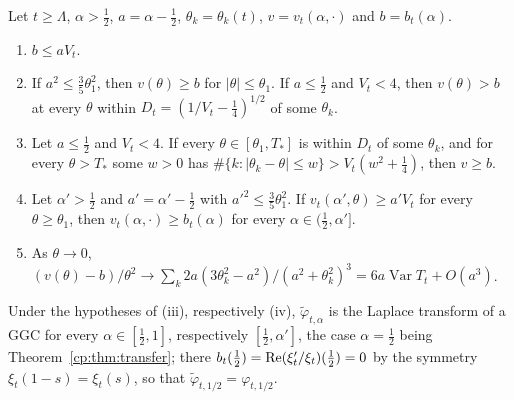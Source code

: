 \begin{proposition}\label{cp:prop:minflow}
Let $t\ge\Lambda$, $\alpha>\frac12$, $a=\alpha-\frac12$, $\theta_k=\theta_k(t)$, $v=v_t(\alpha,\cdot)$ and $b=b_t(\alpha)$.
\begin{enumerate}
\item[(i)] $b\le aV_t$.
\item[(ii)] If $a^2\le\frac35\theta_1^2$, then $v(\theta)\ge b$ for $|\theta|\le\theta_1$. If $a\le\frac12$ and $V_t<4$, then $v(\theta)>b$ at every $\theta$ within $D_t=(1/V_t-\frac14)^{1/2}$ of some $\theta_k$.
\item[(iii)] Let $a\le\frac12$ and $V_t<4$. If every $\theta\in[\theta_1,T_*]$ is within $D_t$ of some $\theta_k$, and for every $\theta>T_*$ some $w>0$ has $\#\{k:|\theta_k-\theta|\le w\}>V_t(w^2+\frac14)$, then $v\ge b$.
\item[(iv)] Let $\alpha'>\frac12$ and $a'=\alpha'-\frac12$ with $a'^2\le\frac35\theta_1^2$. If $v_t(\alpha',\theta)\ge a'V_t$ for every $\theta\ge\theta_1$, then $v_t(\alpha,\cdot)\ge b_t(\alpha)$ for every $\alpha\in(\frac12,\alpha']$.
\item[(v)] As $\theta\to0$, $(v(\theta)-b)/\theta^2\to\sum_k2a(3\theta_k^2-a^2)/(a^2+\theta_k^2)^3=6a\operatorname{Var}T_t+O(a^3)$.
\end{enumerate}
Under the hypotheses of (iii), respectively (iv), $\tilde\varphi_{t,\alpha}$ is the Laplace transform of a GGC for every $\alpha\in[\frac12,1]$, respectively $[\frac12,\alpha']$, the case $\alpha=\frac12$ being Theorem~\ref{cp:thm:transfer}; there $b_t(\frac12)=\operatorname{Re}(\xi_t'/\xi_t)(\frac12)=0$ by the symmetry $\xi_t(1-s)=\xi_t(s)$, so that $\tilde\varphi_{t,1/2}=\varphi_{t,1/2}$.
\end{proposition}

